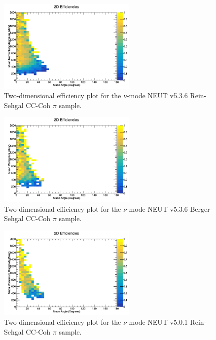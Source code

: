 \documentclass[11pt]{article}
\begin{document}
\begin{figure}[H]
\centering
\includegraphics[width=0.6\textwidth]{CCCohPlots/2DEffNMRS.png}
\caption{Two-dimensional efficiency plot for the $\nu$-mode NEUT v5.3.6 Rein-Sehgal CC-Coh $\pi$ sample.}
\label{fig:app:NMCCCohMuon2DEffRS}
\end{figure}

\begin{figure}[H]
\centering
\includegraphics[width=0.6\textwidth]{CCCohPlots/2DEffNMBS.png}
\caption{Two-dimensional efficiency plot for the $\nu$-mode NEUT v5.3.6 Berger-Sehgal CC-Coh $\pi$ sample.}
\label{fig:app:NMCCCohMuon2DEffBS}
\end{figure}

\begin{figure}[H]
\centering
\includegraphics[width=0.6\textwidth]{CCCohPlots/2DEffNMORS.png}
\caption{Two-dimensional efficiency plot for the $\nu$-mode NEUT v5.0.1 Rein-Sehgal CC-Coh $\pi$ sample.}
\label{fig:app:NMCCCohMuon2DEffORS}
\end{figure}
\end{document}
